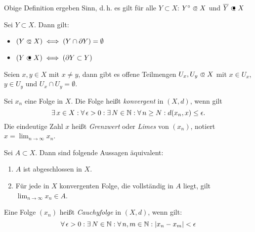\documentclass{cheat-sheet}
\newcommand\opn{\mathrel{\ooalign{$\subset$\cr
  \hidewidth\raise.1ex\hbox{$\circ\mkern.5mu$}\cr}}}
\newcommand\cls{\mathrel{\ooalign{$\subset$\cr
  \hidewidth\raise.1ex\hbox{$\bullet\mkern.5mu$}\cr}}}
\begin{document}
\begin{satz}
Obige Definition ergeben Sinn, d.\,h. es gilt für alle $Y \subset X$: $Y^{\circ} \opn X$ und $\overline{Y} \cls X$
\end{satz}


\begin{satz}
Sei $Y \subset X$. Dann gilt:
\begin{multicols}{2}
  \begin{itemize}
    \item $(Y \opn X) \iff (Y \cap \partial Y) = \emptyset$
    \item $(Y \cls X) \iff (\partial Y \subset Y)$
  \end{itemize}
\end{multicols}
\end{satz}

\begin{satz}
Seien $x, y \in X$ mit $x \not= y$, dann gibt es offene Teilmengen $U_x, U_y \opn X$ mit $x \in U_x$, $y \in U_y$ und $U_x \cap U_y = \emptyset$.
\end{satz}

\begin{defn}
Sei $x_n$ eine Folge in $X$. Die Folge heißt \emph{konvergent} in $(X, d)$, wenn gilt
\[ \exists\,x \in X : \forall\,\epsilon > 0 : \exists\,N \in \mathbb{N} : \forall\,n \ge N : d(x_n, x) \le \epsilon. \]
Die eindeutige Zahl $x$ heißt \emph{Grenzwert} oder \emph{Limes} von $(x_n)$, notiert $x = \lim_{n \to \infty} x_n$.
\end{defn}

\begin{satz}
Sei $A \subset X$. Dann sind folgende Aussagen äquivalent:
\begin{enumerate}
  \item $A$ ist abgeschlossen in $X$.
  \item Für jede in $X$ konvergenten Folge, die vollständig in $A$ liegt, gilt $\lim_{n \to \infty} x_n \in A$.
\end{enumerate}
\end{satz}

\begin{defn}
Eine Folge $(x_n)$ heißt \emph{Cauchyfolge} in $(X, d)$, wenn gilt:
\[ \forall\,\epsilon > 0 : \exists\,N \in \mathbb{N} : \forall\,n, m \in \mathbb{N} : |x_n - x_m| < \epsilon \]
\end{defn}
\end{document}
